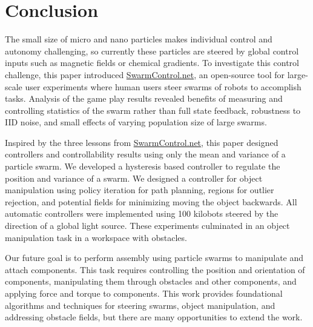 \section{Conclusion}\label{sec:conclusion}
 
  The small size of micro and nano particles makes individual control and autonomy challenging, so currently these particles are steered by global control inputs such as magnetic fields or chemical gradients. To investigate this control challenge, this paper introduced \href{http://www.swarmcontrol.net}{SwarmControl.net}, an open-source tool for large-scale user experiments where human users steer swarms of robots to accomplish tasks.  Analysis of the game play results revealed benefits of measuring and controlling statistics of the swarm rather than full state feedback, robustness to IID noise, and small effects of varying population size of large swarms.

Inspired by the three lessons from \href{www.swarmcontrol.net}{SwarmControl.net}, this paper designed controllers and controllability results using only the mean and variance of a particle swarm. 
We developed a hysteresis based controller to regulate the position and variance of a swarm. We designed a controller for object manipulation using policy iteration for path planning, regions for outlier rejection, and potential fields for minimizing moving the object backwards. 
All automatic controllers were implemented using 100 kilobots steered by the direction of a global light source.
These experiments culminated in an object manipulation task in a workspace with obstacles.
    


Our future goal is to perform assembly using particle swarms to manipulate and attach components. This task requires controlling the position and orientation of components, manipulating them through obstacles and other components, and applying force and torque to components. This work provides foundational algorithms and techniques for steering swarms, object manipulation, and addressing obstacle fields, but there are many opportunities to extend the work.

